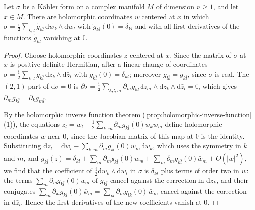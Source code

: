 \begin{lemma}\label{lem:kahler-normal-coordinates}
Let $\sigma$ be a K\"ahler form on a complex manifold $M$ of dimension $n\geq1$, and let $x\in M$. There are holomorphic coordinates $w$ centered at $x$ in which $\sigma=\frac{\mathrm i}{2}\sum_{k,l}\tilde g_{k\bar l}\,\mathrm dw_k\wedge\mathrm d\bar w_l$ with $\tilde g_{k\bar l}(0)=\delta_{kl}$ and with all first derivatives of the functions $\tilde g_{k\bar l}$ vanishing at $0$.
\end{lemma}
\begin{proof}
Choose holomorphic coordinates $z$ centered at $x$. Since the matrix of $\sigma$ at $x$ is positive definite Hermitian, after a linear change of coordinates $\sigma=\frac{\mathrm i}{2}\sum_{k,l}g_{k\bar l}\,\mathrm dz_k\wedge\mathrm d\bar z_l$ with $g_{k\bar l}(0)=\delta_{kl}$; moreover $\overline{g_{l\bar k}}=g_{k\bar l}$, since $\sigma$ is real. The $(2,1)$-part of $\mathrm d\sigma=0$ is $\partial\sigma=\frac{\mathrm i}{2}\sum_{k,l,m}\partial_mg_{k\bar l}\,\mathrm dz_m\wedge\mathrm dz_k\wedge\mathrm d\bar z_l=0$, which gives $\partial_mg_{k\bar l}=\partial_kg_{m\bar l}$.

By the holomorphic inverse function theorem (\cref{prop:holomorphic-inverse-function}(1)), the equations $z_l=w_l-\frac12\sum_{k,m}\partial_mg_{k\bar l}(0)w_kw_m$ define holomorphic coordinates $w$ near $0$, since the Jacobian matrix of this map at $0$ is the identity. Substituting $\mathrm dz_l=\mathrm dw_l-\sum_{k,m}\partial_mg_{k\bar l}(0)w_m\,\mathrm dw_k$, which uses the symmetry in $k$ and $m$, and $g_{k\bar l}(z)=\delta_{kl}+\sum_m\partial_mg_{k\bar l}(0)w_m+\sum_m\partial_{\bar m}g_{k\bar l}(0)\bar w_m+O(|w|^2)$, we find that the coefficient of $\frac{\mathrm i}{2}\mathrm dw_k\wedge\mathrm d\bar w_l$ in $\sigma$ is $\delta_{kl}$ plus terms of order two in $w$: the terms $\sum_m\partial_mg_{k\bar l}(0)w_m$ of $g_{k\bar l}$ cancel against the correction in $\mathrm dz_k$, and their conjugates $\sum_m\partial_{\bar m}g_{k\bar l}(0)\bar w_m=\sum_m\overline{\partial_mg_{l\bar k}(0)}\,\bar w_m$ cancel against the correction in $\mathrm d\bar z_l$. Hence the first derivatives of the new coefficients vanish at $0$.
\end{proof}

